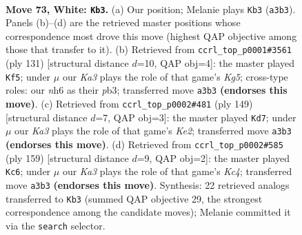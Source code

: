 \documentclass[11pt]{article}
\begin{document}
\clearpage

\begin{figure}[p]\centering
\begin{subfigure}{0.46\textwidth}\centering
\resizebox{\linewidth}{!}{%
\newchessgame
\chessboard[
  setfen={7k/8/1P5n/P7/8/K7/7r/5R2 w - - 9 73},
  showmover=false,
  pgfstyle=straightmove, color=movearrow, markmove={a3-b3}
]}
\caption{}
\end{subfigure}\hfill
\begin{subfigure}{0.46\textwidth}\centering
\resizebox{\linewidth}{!}{%
\newchessgame
\chessboard[
  setfen={8/p3K3/1p6/8/6k1/1PR5/1r6/8 b - - 5 66},
  showmover=false,
  pgfstyle=straightmove, color=movearrow, markmove={g4-f5}
]}
\caption{}
\end{subfigure}
\\[4pt]
\begin{subfigure}{0.46\textwidth}\centering
\resizebox{\linewidth}{!}{%
\newchessgame
\chessboard[
  setfen={8/4k3/2R5/4p3/6K1/8/1rN5/8 b - - 0 75},
  showmover=false,
  pgfstyle=straightmove, color=movearrow, markmove={e7-d7}
]}
\caption{}
\end{subfigure}\hfill
\begin{subfigure}{0.46\textwidth}\centering
\resizebox{\linewidth}{!}{%
\newchessgame
\chessboard[
  setfen={8/3N3p/8/2k2K1p/r7/3R4/8/8 b - - 24 80},
  showmover=false,
  pgfstyle=straightmove, color=movearrow, markmove={c5-c6}
]}
\caption{}
\end{subfigure}
\caption{\textbf{Move 73, White: \texttt{Kb3}.} (a) Our position; Melanie plays \texttt{Kb3} (\texttt{a3b3}). Panels (b)--(d) are the retrieved master positions whose correspondence most drove this move (highest QAP objective among those that transfer to it). (b) Retrieved from \texttt{ccrl\_top\_p0001\#3561} (ply 131) [structural distance $d$=10, QAP obj=4]: the master played \texttt{Kf5}; under $\mu$ our \emph{Ka3} plays the role of that game's \emph{Kg5}; cross-type roles: our \emph{n}h6 as their \emph{p}b3; transferred move \texttt{a3b3} \textbf{(endorses this move)}. (c) Retrieved from \texttt{ccrl\_top\_p0002\#481} (ply 149) [structural distance $d$=7, QAP obj=3]: the master played \texttt{Kd7}; under $\mu$ our \emph{Ka3} plays the role of that game's \emph{Ke2}; transferred move \texttt{a3b3} \textbf{(endorses this move)}. (d) Retrieved from \texttt{ccrl\_top\_p0002\#585} (ply 159) [structural distance $d$=9, QAP obj=2]: the master played \texttt{Kc6}; under $\mu$ our \emph{Ka3} plays the role of that game's \emph{Kc4}; transferred move \texttt{a3b3} \textbf{(endorses this move)}. Synthesis: 22 retrieved analogs transferred to \texttt{Kb3} (summed QAP objective 29, the strongest correspondence among the candidate moves); Melanie committed it via the \texttt{search} selector.}
\label{fig:thought-m144}
\end{figure}
\end{document}
